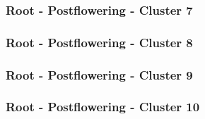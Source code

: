 \clearpage

\subsubsection{Root - Postflowering - Cluster 7}

\vspace{1em}



\clearpage

\subsubsection{Root - Postflowering - Cluster 8}

\vspace{1em}



\clearpage

\subsubsection{Root - Postflowering - Cluster 9}

\vspace{1em}



\clearpage

\subsubsection{Root - Postflowering - Cluster 10}

\vspace{1em}



\clearpage

